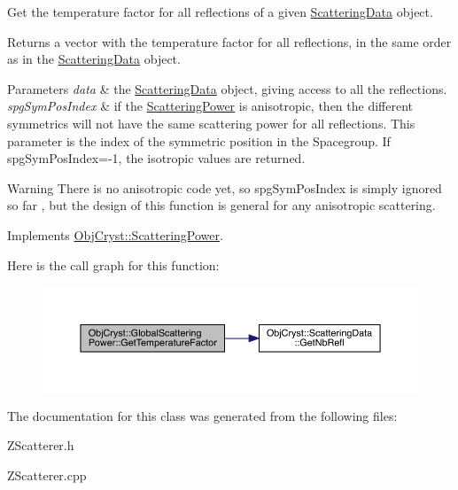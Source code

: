 Get the temperature factor for all reflections of a given \mbox{\hyperlink{class_obj_cryst_1_1_scattering_data}{Scattering\+Data}} object. 

\begin{DoxyReturn}{Returns}
a vector with the temperature factor for all reflections, in the same order as in the \mbox{\hyperlink{class_obj_cryst_1_1_scattering_data}{Scattering\+Data}} object. 
\end{DoxyReturn}

\begin{DoxyParams}{Parameters}
{\em data} & the \mbox{\hyperlink{class_obj_cryst_1_1_scattering_data}{Scattering\+Data}} object, giving access to all the reflections. \\
\hline
{\em spg\+Sym\+Pos\+Index} & if the \mbox{\hyperlink{class_obj_cryst_1_1_scattering_power}{Scattering\+Power}} is anisotropic, then the different symmetrics will not have the same scattering power for all reflections. This parameter is the index of the symmetric position in the Spacegroup. If spg\+Sym\+Pos\+Index=-\/1, the isotropic values are returned. \\
\hline
\end{DoxyParams}
\begin{DoxyWarning}{Warning}
There is no anisotropic code yet, so spg\+Sym\+Pos\+Index is simply ignored so far , but the design of this function is general for any anisotropic scattering. 
\end{DoxyWarning}


Implements \mbox{\hyperlink{class_obj_cryst_1_1_scattering_power_a3df723db77380c82ecff5f7050490255}{Obj\+Cryst\+::\+Scattering\+Power}}.

Here is the call graph for this function\+:
\nopagebreak
\begin{figure}[H]
\begin{center}
\leavevmode
\includegraphics[width=350pt]{class_obj_cryst_1_1_global_scattering_power_a52a96c9df409e14e5209fa0d1c16781c_cgraph}
\end{center}
\end{figure}


The documentation for this class was generated from the following files\+:\begin{DoxyCompactItemize}
\item 
Z\+Scatterer.\+h\item 
Z\+Scatterer.\+cpp\end{DoxyCompactItemize}
